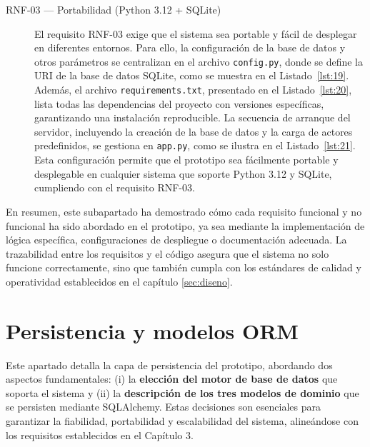 \begin{description}
\item[RNF-03 — Portabilidad (Python 3.12 + SQLite)]  
El requisito RNF-03 exige que el sistema sea portable y fácil de desplegar en diferentes entornos. Para ello, la configuración de la base de datos y otros parámetros se centralizan en el archivo \texttt{config.py}, donde se define la URI de la base de datos SQLite, como se muestra en el Listado~\ref{lst:19}. Además, el archivo \texttt{requirements.txt}, presentado en el Listado~\ref{lst:20}, lista todas las dependencias del proyecto con versiones específicas, garantizando una instalación reproducible. La secuencia de arranque del servidor, incluyendo la creación de la base de datos y la carga de actores predefinidos, se gestiona en \texttt{app.py}, como se ilustra en el Listado~\ref{lst:21}. Esta configuración permite que el prototipo sea fácilmente portable y desplegable en cualquier sistema que soporte Python 3.12 y SQLite, cumpliendo con el requisito RNF-03.


\end{description}

En resumen, este subapartado ha demostrado cómo cada requisito funcional y no funcional ha sido abordado en el prototipo, ya sea mediante la implementación de lógica específica, configuraciones de despliegue o documentación adecuada. La trazabilidad entre los requisitos y el código asegura que el sistema no solo funcione correctamente, sino que también cumpla con los estándares de calidad y operatividad establecidos en el capítulo \ref{sec:diseno}.




\section{Persistencia y modelos ORM}
\label{subsec:orm}

Este apartado detalla la capa de persistencia del prototipo, abordando dos aspectos fundamentales: (i) la \textbf{elección del motor de base de datos} que soporta el sistema y (ii) la \textbf{descripción de los tres modelos de dominio} que se persisten mediante SQLAlchemy. Estas decisiones son esenciales para garantizar la fiabilidad, portabilidad y escalabilidad del sistema, alineándose con los requisitos establecidos en el Capítulo 3.


